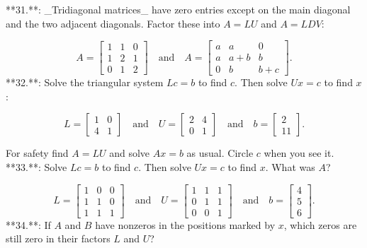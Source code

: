 

**31.**: _Tridiagonal matrices_ have zero entries except on the main diagonal and the two adjacent diagonals. Factor these into \(A=LU\) and \(A=LDV\):

\[A=\begin{bmatrix}1&1&0\\ 1&2&1\\ 0&1&2\end{bmatrix}\quad\text{and}\quad A=\begin{bmatrix}a&a&0\\ a&a+b&b\\ 0&b&b+c\end{bmatrix}.\]
**32.**: Solve the triangular system \(Lc=b\) to find \(c\). Then solve \(Ux=c\) to find \(x\):

\[L=\begin{bmatrix}1&0\\ 4&1\end{bmatrix}\quad\text{and}\quad U=\begin{bmatrix}2&4\\ 0&1\end{bmatrix}\quad\text{and}\quad b=\begin{bmatrix}2\\ 11\end{bmatrix}.\]

For safety find \(A=LU\) and solve \(Ax=b\) as usual. Circle \(c\) when you see it.
**33.**: Solve \(Lc=b\) to find \(c\). Then solve \(Ux=c\) to find \(x\). What was \(A\)?

\[L=\begin{bmatrix}1&0&0\\ 1&1&0\\ 1&1&1\end{bmatrix}\quad\text{and}\quad U=\begin{bmatrix}1&1&1\\ 0&1&1\\ 0&0&1\end{bmatrix}\quad\text{and}\quad b=\begin{bmatrix}4\\ 5\\ 6\end{bmatrix}.\]
**34.**: If \(A\) and \(B\) have nonzeros in the positions marked by \(x\), which zeros are still zero in their factors \(L\) and \(U\)?

